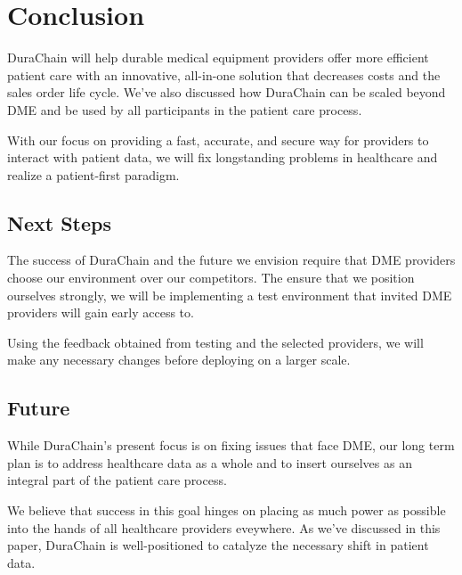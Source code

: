 \section{Conclusion}
DuraChain will help durable medical equipment providers offer more efficient patient care with an innovative, all-in-one solution that decreases costs and the sales order life cycle.  We've also discussed how DuraChain can be scaled beyond DME and be used by all participants in the patient care process.%

With our focus on providing a fast, accurate, and secure way for providers to interact with patient data, we will fix longstanding problems in healthcare and realize a patient-first paradigm.%

\subsection{Next Steps}
The success of DuraChain and the future we envision require that DME providers choose our environment over our competitors. The ensure that we position ourselves strongly, we will be implementing a test environment that invited DME providers will gain early access to.

Using the feedback obtained from testing and the selected providers, we will make any necessary changes before deploying on a larger scale.%

\subsection{Future}
While DuraChain's present focus is on fixing issues that face DME, our long term plan is to address healthcare data as a whole and to insert ourselves as an integral part of the patient care process.

We believe that success in this goal hinges on placing as much power as possible into the hands of all healthcare providers eveywhere. As we've discussed in this paper, DuraChain is well-positioned to catalyze the necessary shift in patient data.%
